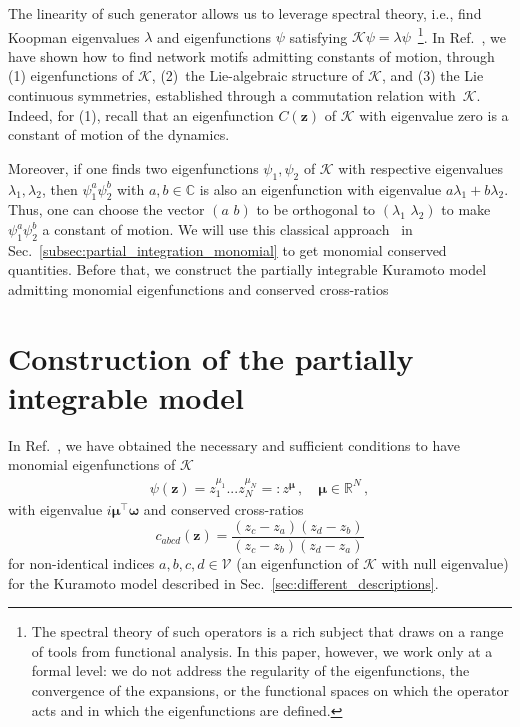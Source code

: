 \documentclass[aps,pre,reprint,longbibliography,superscriptaddress,noshowpacs,floatfix]{revtex4-2}
\theoremstyle{definition}
\theoremstyle{remark}
\begin{document}
The linearity of such generator allows us to leverage spectral theory, i.e., find Koopman eigenvalues $\lambda$ and eigenfunctions $\psi$ satisfying $\mathcal{K}\psi = \lambda\psi$~\footnote{The spectral theory of such operators is a rich subject that draws on a range of tools from functional analysis. In this paper, however, we work only at a formal level: we do not address the regularity of the eigenfunctions, the convergence of the expansions, or the functional spaces on which the operator acts and in which the eigenfunctions are defined.}. In Ref.~\cite{Thibeault2026}, we have shown how to find network motifs admitting constants of motion, through (1) eigenfunctions of $\mathcal{K}$, (2)~the Lie-algebraic structure of $\mathcal{K}$, and (3) the Lie continuous symmetries, established through a commutation relation with~$\mathcal{K}$. Indeed, for (1), recall that an eigenfunction $C(\bm{z})$ of $\mathcal{K}$ with eigenvalue zero is a constant of motion of the dynamics. 

Moreover, if one finds two eigenfunctions $\psi_1, \psi_2$ of $\mathcal{K}$ with respective eigenvalues $\lambda_1, \lambda_2$, then $\psi_1^a\psi_2^b$ with $a,b\in\mathbb{C}$ is also an eigenfunction with eigenvalue $a\lambda_1 + b\lambda_2$. Thus, one can choose the vector $(a\,\,b)$ to be orthogonal to $(\lambda_1\,\,\lambda_2)$ to make $\psi_1^a\psi_2^b$ a constant of motion. We will use this classical approach~\cite{Darboux1878, Goriely2001, Zhang2017} in Sec.~\ref{subsec:partial_integration_monomial} to get monomial conserved quantities. Before that, we construct the partially integrable Kuramoto model admitting monomial eigenfunctions and conserved cross-ratios


\section{Construction of the partially integrable model}
In Ref.~\cite{Thibeault2026}, we have obtained the necessary and sufficient conditions to have monomial eigenfunctions of $\mathcal{K}$
\begin{align}
    \psi(\bm{z}) = z_1^{\mu_1}...z_N^{\mu_N} =: z^{\bm{\mu}}\,,\quad \bm{\mu}\in\mathbb{R}^N\,,
\end{align}
with eigenvalue $i\bm{\mu}^\top\bm{\omega}$ and conserved cross-ratios
\begin{equation}\label{eq:cross_ratio}
c_{abcd}(\bm{z}) = \frac{(z_{c}-z_{a})(z_{d}-z_{b})}{(z_{c}-z_{b})(z_{d}-z_{a})}%
\end{equation}
for non-identical indices $a,b,c,d\in\mathcal{V}$ (an eigenfunction of $\mathcal{K}$ with null eigenvalue) for the Kuramoto model described in Sec.~\ref{sec:different_descriptions}. 
\end{document}
